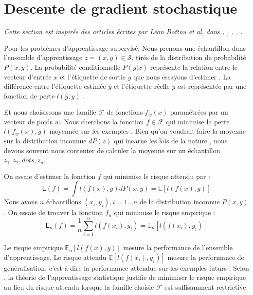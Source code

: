 	
	\section{Descente de gradient stochastique} \label{sec:sgd}
	\textit{Cette section est inspirée des articles écrites par Léon Bottou et al, dans \cite{bottou2012stochastic, bottou2010large},
	\cite{framling2004scaled},
	\cite{bottou2018optimization},
	\cite{netrapalli2019stochastic},
	\cite{wijnhoven2010fast}.}
	
	Pour les problèmes d'apprentissage supervisé, Nous prenons une échantillon  dans l'ensemble  d'apprentissage $z = (x, y) \in \mathcal{S}$, tirés de la distribution de probabilité $P(x, y)$. La probabilité conditionnelle $P(y|x)$ représente la relation entre le vecteur d'entrée $x$ et l'étiquette de sortie $y$ que nous essayons d'estimer \cite{wijnhoven2010fast}. La différence entre l'étiquette estimée $\hat{y}$ et l'étiquette réelle $y$ est représentée par une fonction de perte $l(\hat{y}, y)$ \cite{bottou2012stochastic}.
	
	Et nous choisissons une famille $\mathcal{F}$ de fonctions $f_w(x)$ paramétrées par un vecteur de poids $w$. Nous cherchons la fonction $ f \in \mathcal{F}$ qui minimise la perte $l(f_w(x), y)$ moyennée sur les exemples  \cite{wijnhoven2010fast}. Bien qu’on voudrait faire la moyenne  sur la distribution inconnue $dP(z)$ qui incarne les lois de la nature \cite{bottou2012stochastic}, nous devons souvent nous contenter de calculer la moyenne sur un échantillon $z_1,z_2,dots,z_n$.
	
	On essaie d'estimer la fonction $f$ qui minimise le risque attendu  \cite{bottou2010large} par :
	$$
	 \mathsf{E}(f) = \int l(f(x),y)dP(x,y) = \mathbb{E}[l(f(x),y)]
	$$
	Nous avons $n$ échantillons $(x_i, y_i), i = 1...n$ de la distribution inconnue $P(x, y)$. On essaie de trouver la fonction $f_n$ qui minimise le risque empirique \cite{bottou2010large} :
	\begin{equation}
		\mathsf{E}_n(f) = \frac{1}{n} \sum_{i=1}^{n} l(f(x_i),y_i) = \mathbb{E}_n[l(f(x_i),y_i)]
	\end{equation}
	
	Le risque empirique $\mathbb{E}_n[l(f(x),y)]$ mesure la performance de l'ensemble d'apprentissage. Le risque attendu $\mathbb{E}[l(f(x_i),y_i)]$ mesure la performance de généralisation, c'est-à-dire la performance attendue sur les exemples futurs \cite{bottou2012stochastic, ernst2014stochastic}. Selon \cite{bottou2012stochastic}, la théorie de l'apprentissage statistique justifie de minimiser le risque empirique au lieu du risque attendu lorsque la famille choisie $\mathcal{F}$ est suffisamment restrictive.
	
